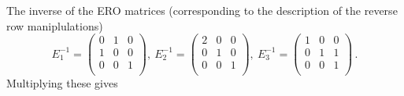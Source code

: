 \begin{example}
The inverse of the ERO matrices (corresponding to the description of the reverse row maniplulations)
\[
E_1^{-1}
= \left(\begin{array}{ccc}
0  &1 &0\\
1  &0 &0\\ 
0  &0 &1\\
\end{array}  \right)
,~
E_2^{-1}
= \left(\begin{array}{ccc}
2  &0 &0\\
0  &1 &0\\ 
0  &0 &1\\
\end{array}  \right) , ~
E_3^{-1}
= \left(\begin{array}{ccc}
1  &0 &0\\
0  &1 & 1\\ 
0  &0 &1\\
\end{array}  \right) \,.
\]
Multiplying these gives 

\end{example}
